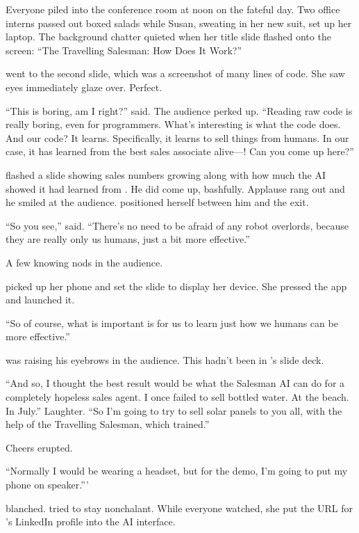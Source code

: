 Everyone piled into the conference room at noon on the fateful day. Two office interns passed out boxed salads while Susan, sweating in her new suit, set up her laptop. The background chatter quieted when her title slide flashed onto the screen: ``The Travelling Salesman: How Does It Work?''

{\protag} went to the second slide, which was a screenshot of many lines of code. She saw eyes immediately glaze over. Perfect.

``This is boring, am I right?'' {\protag} said. The audience perked up. ``Reading raw code is really boring, even for programmers. What's interesting is what the code does. And our code? It learns. Specifically, it learns to sell things from humans. In our case, it has learned from the best sales associate alive---\energyJerk{}! Can you come up here?''

{\protag} flashed a slide showing sales numbers growing along with how much the AI showed it had learned from \energyJerk{}. He did come up, bashfully. Applause rang out and he smiled at the audience. {\protag} positioned herself between him and the exit.

``So you see,'' {\protag} said. ``There's no need to be afraid of any robot overlords, because they are really only us humans, just a bit more effective.''

A few knowing nods in the audience.

{\protag} picked up her phone and set the slide to display her device. She pressed the app and launched it.

``So of course, what is important is for us to learn just how we humans can be more effective.''

\Boss{} was raising his eyebrows in the audience. This hadn't been in {\protag}'s slide deck.

``And so, I thought the best result would be what the Salesman AI can do for a completely hopeless sales agent. I once failed to sell bottled water. At the beach. In July.'' Laughter. ``So I'm going to try to sell solar panels to you all, with the help of the Travelling Salesman, which \energyJerk{} trained.''

Cheers erupted.

``Normally I would be wearing a headset, but for the demo, I'm going to put my phone on speaker.'''

\energyJerk{} blanched. {\protag} tried to stay nonchalant. While everyone watched, she put the URL for \energyJerk{}'s LinkedIn profile into the AI interface.

